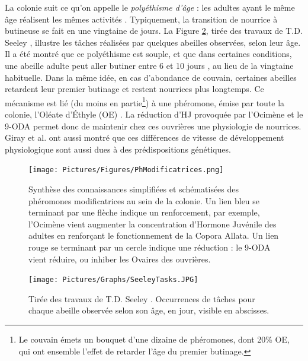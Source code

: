 			 La colonie suit ce qu'on appelle le \textit{polyéthisme d'âge} : les adultes ayant le même âge réalisent les mêmes activités \cite{seeley_age_1991}. Typiquement, la transition de nourrice à butineuse se fait en une vingtaine de jours. La Figure \ref{SeeleyTasks}, tirée des travaux de T.D. Seeley \cite{seeley_wisdom_1995}, illustre les tâches réalisées par quelques abeilles observées, selon leur âge. Il a été montré que ce polyéthisme est souple, et que dans certaines conditions, une abeille adulte peut aller butiner entre 6 et 10 jours \cite{giray_effects_1994}, au lieu de la vingtaine habituelle. Dans la même idée, en cas d'abondance de couvain, certaines abeilles retardent leur premier butinage et restent nourrices plus longtemps. Ce mécanisme est lié (du moins en partie\footnote{Le couvain émets un bouquet d'une dizaine de phéromones, dont 20\% OE, qui ont ensemble l'effet de retarder l'âge du premier butinage.}) à une phéromone, émise par toute la colonie, l'Oléate d'Éthyle (OE) \cite{le_conte_primer_2001}. La réduction d'HJ provoquée par l'Ocimène et le 9-ODA permet donc de maintenir chez ces ouvrières une physiologie de nourrices. Giray et al. \cite{giray_effects_1994} ont aussi montré que ces différences de vitesse de développement physiologique sont aussi dues à des prédispositions génétiques.		 
			
			\begin{figure}
			\centering
				\texttt{[image: Pictures/Figures/PhModificatrices.png]}
				\caption[Synthèse des connaissances simplifiées et schématisées des phéromones modificatrices au sein de la colonie.]{Synthèse des connaissances simplifiées et schématisées des phéromones modificatrices au sein de la colonie. Un lien bleu se terminant par une flèche indique un renforcement, par exemple, l'Ocimène vient augmenter la concentration d'Hormone Juvénile des adultes en renforçant le fonctionnement de la Copora Allata. Un lien rouge se terminant par un cercle indique une réduction : le 9-ODA vient réduire, ou inhiber les Ovaires des ouvrières.}
				\label{phMod}
			\end{figure}	
			
			\begin{figure}
			\centering
				\texttt{[image: Pictures/Graphs/SeeleyTasks.JPG]}
				\caption{Tirée des travaux de T.D. Seeley \cite{seeley_wisdom_1995}. Occurrences de tâches pour chaque abeille observée selon son âge, en jour, visible en abscisses.}
				\label{SeeleyTasks}
			\end{figure}	
			
